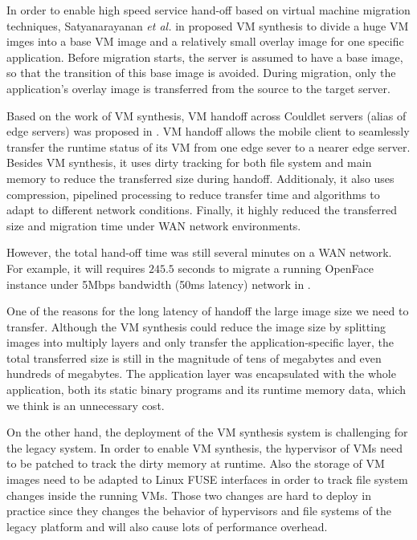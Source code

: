 In order to enable high speed service hand-off based on virtual machine migration techniques, Satyanarayanan \textit{et al.} in \cite{satya2009case} proposed VM synthesis to divide a huge VM imges into a base VM image and a relatively small overlay image for one specific application. Before migration starts, the server is assumed to have a base image, so that the transition of this base image is avoided. During migration, only the application's overlay image is transferred from the source to the target server.

Based on the work of VM synthesis, VM handoff across Couldlet servers (alias of edge servers) was proposed in \cite{ha2015vmhandoff}. VM handoff allows the mobile client to seamlessly transfer the runtime status of its VM from one edge sever to a nearer edge server. Besides VM synthesis, it uses dirty tracking for both file system and main memory  to reduce the transferred size during handoff.
Additionaly, it also uses compression, pipelined processing to reduce transfer time and algorithms to adapt to different network conditions.
Finally, it highly reduced the transferred size and migration time under WAN network environments.

However,
the total hand-off time was still several minutes on a WAN network. For example, it will requires $245.5$ seconds to migrate a running OpenFace instance under 5Mbps bandwidth (50ms latency) network in \cite{ha2015vmhandoff}. 

One of the reasons for the long latency of handoff the large image size we need to transfer. Although the VM synthesis could reduce the image size by splitting images into multiply layers and only transfer the application-specific layer, the total transferred size is still in the magnitude of tens of megabytes and even hundreds of megabytes. 
The application layer was encapsulated with the whole application, both its static binary programs and its runtime memory data, which we think is an unnecessary cost. 

On the other hand, the deployment of the VM synthesis system is challenging for the legacy system. In order to enable VM synthesis, the hypervisor of VMs need to be patched to track the dirty memory at runtime. Also the storage of VM images need to be adapted to Linux FUSE interfaces in order to track file system changes inside the running VMs. Those two changes are hard to deploy in practice since they changes the behavior of hypervisors and file systems of the legacy platform and will also cause lots of performance overhead. 


